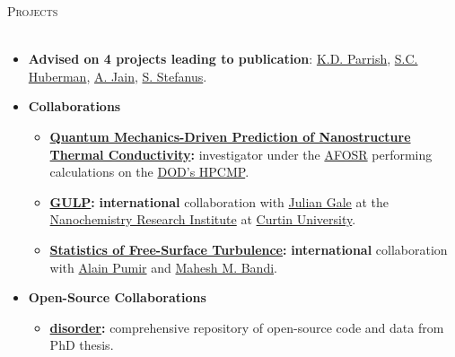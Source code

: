 \documentclass{article}
\newcommand{\lineunder}{\vspace*{-8pt} \\ \hspace*{-18pt} \hrulefill \\}
\newcommand{\header}[1]{{\hspace*{-15pt}\vspace*{6pt} \textsc{#1}} \vspace*{-6pt} \lineunder}
\newenvironment{achievements}{\begin{list}{$\bullet$}{\topsep 0pt \itemsep -2pt}}{\vspace*{4pt}\end{list}}
\begin{document}
\header{\Large{Projects}}
\begin{itemize}[leftmargin=*]

  \item \textbf{Advised on 4 projects leading to publication}: \href{http://ntpl.me.cmu.edu/publications.html}{K.D. Parrish}, \href{https://tspace.library.utoronto.ca/bitstream/1807/42871/1/Huberman_Samuel_C_201311_MASc_thesis.pdf}{S.C. Huberman}, \href{http://blogs.ubc.ca/amerimech2014/files/2014/04/ameritech_mcgaughey_apr14.pdf}{A. Jain}, \href{http://jasonlarkin.github.io/pub.html}{S. Stefanus}.

\item \textbf{Collaborations}

\begin{itemize}[leftmargin=10pt,itemindent=10pt, noitemsep, topsep=1pt, parsep=1pt, partopsep=1pt]

\item \textbf{\href{http://ntpl.me.cmu.edu/research.html}{Quantum Mechanics-Driven Prediction of Nanostructure Thermal Conductivity}:} investigator under the 
\href{http://www.wpafb.af.mil/afrl/afosr/}{AFOSR} performing 
calculations on the \href{http://www.hpcmo.hpc.mil/cms2/index.php}{DOD's HPCMP}.

\item \textbf{\href{https://nanochemistry.curtin.edu.au/local/docs/gulp/gulp4.2_manual.pdf}{GULP}:} \textbf{international} collaboration with \href{http://nanochemistry.curtin.edu.au/people/staff.cfm/J.Gale}{Julian Gale} at the 
\href{http://nanochemistry.curtin.edu.au/}{Nanochemistry Research Institute} at \href{http://www.curtin.edu.au/}{Curtin University}.

\item \textbf{\href{http://jasonlarkin.github.io/projects-ms.html}{Statistics of Free-Surface Turbulence}:} \textbf{international} collaboration with \href{http://perso.ens-lyon.fr/alain.pumir/Pumir_webpage.html}{Alain Pumir} and \href{https://groups.oist.jp/ciu/mahesh-m-bandi}{Mahesh M. Bandi}.  

\end{itemize}

\item \textbf{Open-Source Collaborations}

\begin{itemize}[leftmargin=10pt,itemindent=10pt, noitemsep, topsep=1pt, parsep=1pt, partopsep=1pt]

  \item \textbf{\href{https://github.com/jasonlarkin/disorder}{disorder}:} comprehensive repository of open-source code and data from PhD thesis.


\end{itemize}
\end{itemize}
\end{document}
